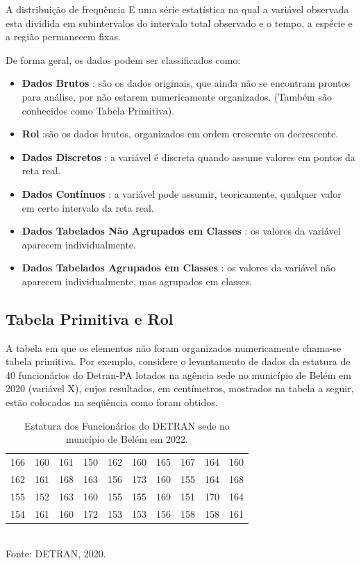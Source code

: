 \inic A distribuição de frequência E uma série estatística na qual a variável observada esta dividida em subintervalos do intervalo total observado e o tempo, a espécie e a região permanecem fixas.\vskip0.3cm

De forma geral, os dados podem ser classificados como:


\begin{itemize}
  \item \textbf{Dados Brutos} : são os dados originais, que ainda não se encontram prontos para análise, por não estarem numericamente organizados. (Também são conhecidos como Tabela Primitiva).
  \item \textbf{Rol} :são os dados brutos, organizados em ordem crescente ou decrescente.
  \item \textbf{Dados Discretos} : a variável é discreta quando assume valores em pontos da reta real.
  \item \textbf{Dados Contínuos} : a variável pode assumir, teoricamente, qualquer valor em certo intervalo da reta real.
  \item \textbf{Dados Tabelados Não Agrupados em Classes} : os valores da variável aparecem individualmente.
  \item \textbf{Dados Tabelados Agrupados em Classes} : os valores da variável não aparecem individualmente, mas agrupados em classes.
\end{itemize}


\subsection{Tabela Primitiva e Rol}


\inic A tabela em que os elementos não foram organizados numericamente chama-se tabela primitiva. Por exemplo, considere o levantamento de dados da estatura de 40 funcionários do Detran-PA lotados na agência sede no município de Belém em 2020 (variável X), cujos resultados, em centímetros, mostrados na tabela a seguir, estão colocados na seqüência como foram obtidos.


\begin{table}[!htb]
    \centering
    {
    \caption{Estatura dos Funcionários do DETRAN sede no muncípio de Belém em 2022.}
    \label{estatura}
    \vspace{0.2cm}
\begin{tabular}{c|c|c|c|c|c|c|c|c|c}
  \hline\hline
  166 & 160 & 161 & 150 & 162 & 160 & 165 & 167 & 164 & 160 \\
  162 & 161 & 168 & 163 & 156 & 173 & 160 & 155 & 164 & 168 \\
  155 & 152 & 163 & 160 & 155 & 155 & 169 & 151 & 170 & 164 \\
  154 & 161 & 160 & 172 & 153 & 153 & 156 & 158 & 158 & 161 \\
  \hline\hline
\end{tabular}}
\\
\hspace{-5.5cm} Fonte: DETRAN, 2020.
\end{table}

